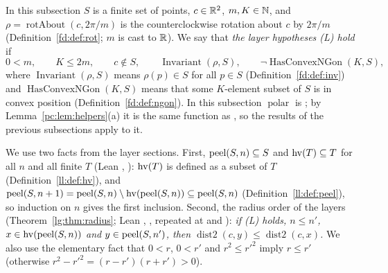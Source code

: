 In this subsection $S$ is a finite set of points, $c\in\mathbb R^2$, $m,K\in\mathbb N$, and $\rho=\operatorname{rotAbout}(c,2\pi/m)$
is the counterclockwise rotation about $c$ by $2\pi/m$ (Definition~\ref{fd:def:rot}; $m$ is cast to $\mathbb R$). We say that
\emph{the layer hypotheses \textup{(L)} hold} if
\[
  0<m,\qquad K\le 2m,\qquad c\notin S,\qquad \operatorname{Invariant}(\rho,S),\qquad \neg\operatorname{HasConvexNGon}(K,S),
\]
where $\operatorname{Invariant}(\rho,S)$ means $\rho(p)\in S$ for all $p\in S$ (Definition~\ref{fd:def:inv}) and
$\operatorname{HasConvexNGon}(K,S)$ means that some $K$-element subset of $S$ is in convex position
(Definition~\ref{fd:def:ngon}). In this subsection $\operatorname{polar}$ is ; by
Lemma~\ref{pc:lem:helpers}(a) it is the same function as , so the results of the
previous subsections apply to it.

We use two facts from the layer sections. First, $\operatorname{peel}(S,n)\subseteq S$ and $\operatorname{hv}(T)\subseteq T$ for all $n$ and
all finite $T$ (Lean , ): $\operatorname{hv}(T)$ is defined as a subset of $T$
(Definition~\ref{ll:def:hv}), and $\operatorname{peel}(S,n+1)=\operatorname{peel}(S,n)\setminus\operatorname{hv}(\operatorname{peel}(S,n))\subseteq\operatorname{peel}(S,n)$
(Definition~\ref{ll:def:peel}), so induction on $n$ gives the first inclusion. Second, the radius order of the
layers (Theorem~\ref{lg:thm:radius}; Lean ,
, repeated at  and
): \emph{if \textup{(L)} holds, $n\le n'$, $x\in\operatorname{hv}(\operatorname{peel}(S,n))$ and
$y\in\operatorname{peel}(S,n')$, then $\operatorname{dist2}(c,y)\le\operatorname{dist2}(c,x)$.} We also use the elementary fact
that $0<r$, $0<r'$ and $r^2\le r'^2$ imply $r\le r'$ (otherwise $r^2-r'^2=(r-r')(r+r')>0$).


